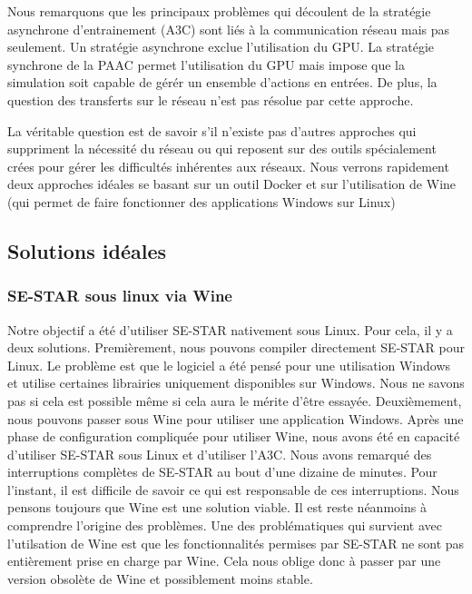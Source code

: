 Nous remarquons que les principaux problèmes qui découlent de la stratégie asynchrone d'entrainement (A3C) sont liés à la communication réseau mais pas seulement. Un stratégie asynchrone exclue l'utilisation du \gls{GPU}. La stratégie synchrone de la \gls{PAAC} permet l'utilisation du GPU mais impose que la simulation soit capable de gérér un ensemble d'actions en entrées. De plus, la question des transferts sur le réseau n'est pas résolue par cette approche. 

La véritable question est de savoir s'il n'existe pas d'autres approches qui suppriment la nécessité du réseau ou qui reposent sur des outils spécialement crées pour gérer les difficultés inhérentes aux réseaux. Nous verrons rapidement deux approches idéales se basant sur un outil Docker \cite{Merkel:2014:DLL:2600239.2600241} et sur l'utilisation de \gls{Wine} (qui permet de faire fonctionner des applications Windows sur Linux)

\subsection{Solutions idéales}

\subsubsection{SE-STAR sous linux via \gls{Wine}}
Notre objectif a été d'utiliser SE-STAR nativement sous Linux. Pour cela, il y a deux solutions. 
Premièrement, nous pouvons compiler directement SE-STAR pour Linux. Le problème est que le logiciel a été pensé pour une utilisation Windows et utilise certaines librairies uniquement disponibles sur Windows. Nous ne savons pas si cela est possible même si cela aura le mérite d'être essayée. 
Deuxièmement, nous pouvons passer sous Wine pour utiliser une application Windows. Après une phase de configuration compliquée pour utiliser Wine, nous avons été en capacité d'utiliser SE-STAR sous Linux et d'utiliser l'\gls{A3C}. Nous avons remarqué des interruptions complètes de SE-STAR au bout d'une dizaine de minutes. Pour l'instant, il est difficile de savoir ce qui est responsable de ces interruptions. Nous pensons toujours que Wine est une solution viable. Il est reste néanmoins à comprendre l'origine des problèmes. Une des problématiques qui survient avec l'utilsation de Wine est que les fonctionnalités permises par SE-STAR ne sont pas entièrement prise en charge par Wine. Cela nous oblige donc à passer par une version obsolète de Wine et possiblement moins stable.

